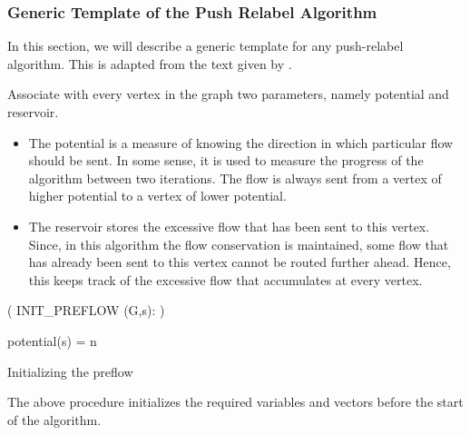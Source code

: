 \documentclass[BTech]{iitmdiss}
\begin{document}
	      
	      \subsubsection{Generic Template of the Push Relabel Algorithm}
	      In this section, we will describe a generic template for any push-relabel algorithm. This is adapted from the text given by 
	      \cite{clrs}.
	      
	      Associate with every vertex in the graph two parameters, namely potential and reservoir.
	      \begin{itemize}
	       \item 
		  The potential is a measure of knowing the direction in which particular flow should be sent.
	      In some sense, it is used to measure the progress of the algorithm between two iterations.
	      The flow is always sent from a vertex of higher potential to a vertex of lower potential. \\
	      
	      \item
		  The reservoir stores the excessive flow that has been sent to this vertex. Since, in this algorithm the flow conservation is maintained,
		  some flow that has already been sent to this vertex cannot be routed further ahead. Hence, this keeps track of the excessive flow 
		  that accumulates at every vertex. \\
		  
		  
	      \end{itemize}

	      
	      \begin{algorithm}[H]
	            
	      \Begin( INIT\_PREFLOW {(G,s)}: ){
		
		
		
 		potential(s) = n \;
		
 		\caption{Initializing the preflow}
	    }
	    
	    \end{algorithm}
	      The above procedure initializes the required variables and vectors before the start of the algorithm. \\
	      
\end{document}

